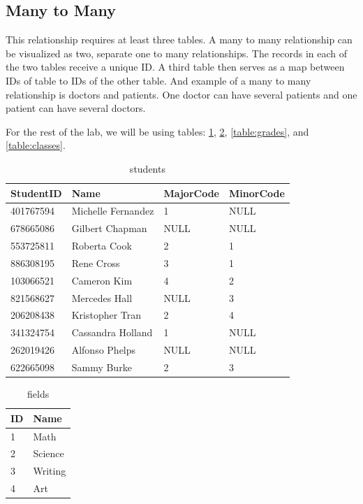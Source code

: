 \subsection*{Many to Many}
This relationship requires at least three tables.
A many to many relationship can be visualized as two, separate one to many relationships.
The records in each of the two tables receive a unique ID.
A third table then serves as a map between IDs of table to IDs of the other table.
And example of a many to many relationship is doctors and patients.
One doctor can have several patients and one patient can have several doctors.

For the rest of the lab, we will be using tables: \ref{table:students}, \ref{table:majors}, \ref{table:grades}, and \ref{table:classes}.

\begin{table}
\begin{tabular}{|l|l|l|l|}
\hline
StudentID & Name & MajorCode & MinorCode \\
\hline
401767594 & Michelle Fernandez & 1 & NULL \\
678665086 & Gilbert Chapman & NULL & NULL\\
553725811 & Roberta Cook & 2 & 1\\
886308195 & Rene Cross & 3 & 1\\
103066521 & Cameron Kim & 4 & 2\\
821568627 & Mercedes Hall & NULL & 3 \\
206208438 & Kristopher Tran & 2 & 4\\
341324754 & Cassandra Holland & 1 & NULL\\
262019426 & Alfonso Phelps & NULL & NULL\\
622665098 & Sammy Burke & 2 & 3 \\
\hline
\end{tabular}
\caption{students}
\label{table:students}
\end{table}

\begin{table}
\begin{tabular}{|l|l|}
\hline
ID & Name \\
\hline
1 & Math \\
2 & Science \\
3 & Writing \\
4 & Art \\
\hline
\end{tabular}
\caption{fields}
\label{table:majors}
\end{table}

